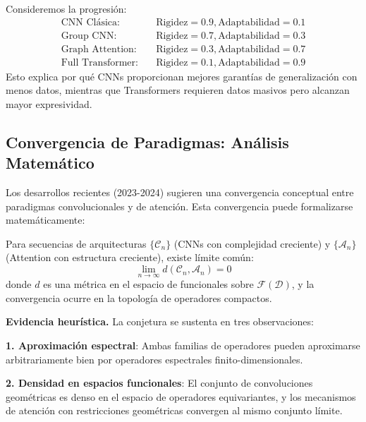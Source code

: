 \begin{example}\label{ex:analisis_espectro}
Consideremos la progresión:
\begin{align}
    \text{CNN Clásica}: &\quad \text{Rigidez} = 0.9, \text{Adaptabilidad} = 0.1 \\
    \text{Group CNN}: &\quad \text{Rigidez} = 0.7, \text{Adaptabilidad} = 0.3 \\
    \text{Graph Attention}: &\quad \text{Rigidez} = 0.3, \text{Adaptabilidad} = 0.7 \\
    \text{Full Transformer}: &\quad \text{Rigidez} = 0.1, \text{Adaptabilidad} = 0.9
\end{align}
Esto explica por qué CNNs proporcionan mejores garantías de generalización con menos datos, mientras que Transformers requieren datos masivos pero alcanzan mayor expresividad.
\end{example}

\subsection{Convergencia de Paradigmas: Análisis Matemático}\label{subsec:convergencia_paradigmas}

Los desarrollos recientes (2023-2024) sugieren una convergencia conceptual entre paradigmas convolucionales y de atención. Esta convergencia puede formalizarse matemáticamente:

\begin{conjecture}\label{conj:convergencia_cnn_attention}
Para secuencias de arquitecturas $\{\mathcal{C}_n\}$ (CNNs con complejidad creciente) y $\{\mathcal{A}_n\}$ (Attention con estructura creciente), existe límite común:
\begin{equation}
    \lim_{n \to \infty} d(\mathcal{C}_n, \mathcal{A}_n) = 0
\end{equation}
donde $d$ es una métrica en el espacio de funcionales sobre $\mathcal{F}(\mathcal{D})$, y la convergencia ocurre en la topología de operadores compactos.
\end{conjecture}

\textbf{Evidencia heurística.} La conjetura se sustenta en tres observaciones:

\textbf{1. Aproximación espectral}: Ambas familias de operadores pueden aproximarse arbitrariamente bien por operadores espectrales finito-dimensionales.

\textbf{2. Densidad en espacios funcionales}: El conjunto de convoluciones geométricas es denso en el espacio de operadores equivariantes, y los mecanismos de atención con restricciones geométricas convergen al mismo conjunto límite.

